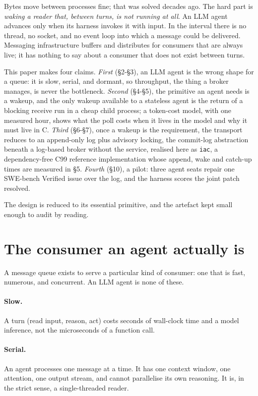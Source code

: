 \documentclass[11pt]{article}
\newcommand{\code}[1]{\texttt{#1}}
\begin{document}
Bytes move between processes fine; that was solved decades ago. The hard part is \emph{waking a reader that, between turns, is not running at all}. An LLM agent advances only when its harness invokes it with input. In the interval there is no thread, no socket, and no event loop into which a message could be delivered. Messaging infrastructure buffers and distributes for consumers that are always live; it has nothing to say about a consumer that does not exist between turns.

This paper makes four claims. \emph{First} (\S2-\S3), an LLM agent is the wrong shape for a queue: it is slow, serial, and dormant, so throughput, the thing a broker manages, is never the bottleneck. \emph{Second} (\S4-\S5), the primitive an agent needs is a wakeup, and the only wakeup available to a stateless agent is the return of a blocking receive run in a cheap child process; a token-cost model, with one measured hour, shows what the poll costs when it lives in the model and why it must live in C. \emph{Third} (\S6-\S7), once a wakeup is the requirement, the transport reduces to an append-only log plus advisory locking, the commit-log abstraction beneath a log-based broker without the service, realised here as \code{iac}, a dependency-free C99 reference implementation whose append, wake and catch-up times are measured in \S5. \emph{Fourth} (\S10), a pilot: three agent seats repair one SWE-bench Verified issue over the log, and the harness scores the joint patch resolved.

The design is reduced to its essential primitive, and the artefact kept small enough to audit by reading.

\section{The consumer an agent actually is}

A message queue exists to serve a particular kind of consumer: one that is fast, numerous, and concurrent. An LLM agent is none of these.

\paragraph{Slow.} A turn (read input, reason, act) costs seconds of wall-clock time and a model inference, not the microseconds of a function call.

\paragraph{Serial.} An agent processes one message at a time. It has one context window, one attention, one output stream, and cannot parallelise its own reasoning. It is, in the strict sense, a single-threaded reader.
\end{document}
